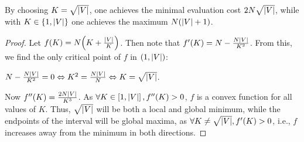 \begin{lemma}
    \label{lemma:min_max_evaluation_cost}
    By choosing $K=\sqrt{\mathopen{}\left|V\right|}$, one achieves the minimal evaluation cost $2 N \sqrt{\mathopen{}\left|V\right|}$, while with $K \in \mathopen{}\left\{1, \mathopen{}\left|V\right|\right\}$ one achieves the maximum $N\mathopen{}\left(\mathopen{}\left|V\right| + 1\right)$.
\end{lemma}
\begin{proof}
    Let $f\mathopen{}\left(K\right) = N\mathopen{}\left(K + \frac{\mathopen{}\left|V\right|}{K}\right)$. Then note that $f'\mathopen{}\left(K\right) = N - \frac{N \mathopen{}\left|V\right|}{K^2}$. From this, we find the only critical point of $f$ in $\mathopen{}\left(1, \mathopen{}\left|V\right|\right)$: 
    
    $N - \frac{N \mathopen{}\left|V\right|}{K^2} = 0 \Leftrightarrow K^2 = \frac{N \mathopen{}\left|V\right|}{N} \Leftrightarrow K = \sqrt{\mathopen{}\left|V\right|}$. 
    
    Now $f''\mathopen{}\left(K\right)=\frac{2 N \mathopen{}\left|V\right|}{K^3}$. As $\forall K \in \mathopen{}\left[1, \mathopen{}\left|V\right|\right], f''\mathopen{}\left(K\right) > 0$, $f$ is a convex function for all values of $K$. Thus, $\sqrt{\mathopen{}\left|V\right|}$ will be both a local and global minimum, while the endpoints of the interval will be global maxima, as $\forall K \neq \sqrt{\mathopen{}\left|V\right|}, f'\mathopen{}\left(K\right) > 0$, i.e., $f$ increases away from the minimum in both directions.
\end{proof}


